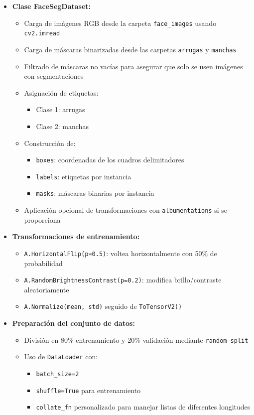 \begin{enumerate}
\begin{itemize}
\begin{itemize}
      \item \textbf{Clase FaceSegDataset:}
      \begin{itemize}
        \item Carga de imágenes RGB desde la carpeta \texttt{face\_images} usando \texttt{cv2.imread}
        \item Carga de máscaras binarizadas desde las carpetas \texttt{arrugas} y \texttt{manchas}
        \item Filtrado de máscaras no vacías para asegurar que solo se usen imágenes con segmentaciones
        \item Asignación de etiquetas:
        \begin{itemize}
          \item Clase 1: arrugas
          \item Clase 2: manchas
        \end{itemize}
        \item Construcción de:
        \begin{itemize}
          \item \texttt{boxes}: coordenadas de los cuadros delimitadores
          \item \texttt{labels}: etiquetas por instancia
          \item \texttt{masks}: máscaras binarias por instancia
        \end{itemize}
        \item Aplicación opcional de transformaciones con \texttt{albumentations} si se proporciona
      \end{itemize}
  
      \item \textbf{Transformaciones de entrenamiento:}
      \begin{itemize}
        \item \texttt{A.HorizontalFlip(p=0.5)}: voltea horizontalmente con 50\% de probabilidad
        \item \texttt{A.RandomBrightnessContrast(p=0.2)}: modifica brillo/contraste aleatoriamente
        \item \texttt{A.Normalize(mean, std)} seguido de \texttt{ToTensorV2()}
      \end{itemize}
  
      \item \textbf{Preparación del conjunto de datos:}
      \begin{itemize}
        \item División en 80\% entrenamiento y 20\% validación mediante \texttt{random\_split}
        \item Uso de \texttt{DataLoader} con:
        \begin{itemize}
          \item \texttt{batch\_size=2}
          \item \texttt{shuffle=True} para entrenamiento
          \item \texttt{collate\_fn} personalizado para manejar listas de diferentes longitudes
        \end{itemize}
      \end{itemize}
  

\end{itemize}
\end{itemize}
\end{enumerate}
